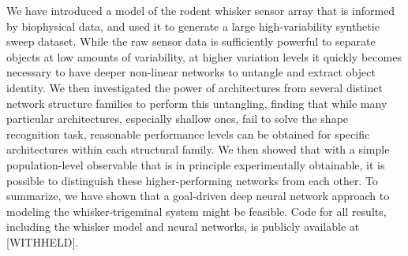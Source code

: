 We have introduced a model of the rodent whisker sensor array that is informed by biophysical data, and used it to generate a large high-variability synthetic sweep dataset. 
While the raw sensor data is sufficiently powerful to separate objects at low amounts of variability, at higher variation levels it quickly becomes necessary to have deeper non-linear networks to untangle and extract object identity. 
We then investigated the power of architectures from several distinct network structure families to perform this untangling, finding that while many particular architectures, especially shallow ones, fail to solve the shape recognition task, reasonable performance levels can be obtained for specific architectures within each structural family.
We then showed that with a simple population-level observable that is in principle experimentally obtainable, it is possible to distinguish these higher-performing networks from each other. 
To summarize, we have shown that a goal-driven deep neural network approach to modeling the whisker-trigeminal system might be feasible. 
Code for all results, including the whisker model and neural networks, is publicly available at [WITHHELD].

